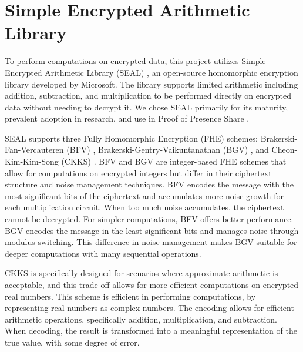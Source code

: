 \section{Simple Encrypted Arithmetic Library}

To perform computations on encrypted data, this project utilizes Simple Encrypted Arithmetic Library (SEAL) \cite{sealcrypto}, an open-source homomorphic encryption library developed by Microsoft. The library supports limited arithmetic including addition, subtraction, and multiplication to be performed directly on encrypted data without needing to decrypt it. We chose SEAL primarily for its maturity, prevalent adoption in research, and use in Proof of Presence Share \cite{Lagesse2021-PopShare}.

SEAL supports three Fully Homomorphic Encryption (FHE) schemes: Brakerski-Fan-Vercauteren (BFV) \cite{fan2012-bfv}, Brakerski-Gentry-Vaikuntanathan (BGV) \cite{brakerski2012-bgv}, and Cheon-Kim-Kim-Song (CKKS) \cite{Cheon2017-CKKS}. BFV and BGV are integer-based FHE schemes that allow for computations on encrypted integers but differ in their ciphertext structure and noise management techniques. BFV encodes the message with the most significant bits of the ciphertext and accumulates more noise growth for each multiplication circuit. When too much noise accumulates, the ciphertext cannot be decrypted. For simpler computations, BFV offers better performance. BGV encodes the message in the least significant bits and manages noise through modulus switching. This difference in noise management makes BGV suitable for deeper computations with many sequential operations. 

CKKS is specifically designed for scenarios where approximate arithmetic is acceptable, and this trade-off allows for more efficient computations on encrypted real numbers. This scheme is efficient in performing computations, by representing real numbers as complex numbers. The encoding allows for efficient arithmetic operations, specifically addition, multiplication, and subtraction. When decoding, the result is transformed into a meaningful representation of the true value, with some degree of error. 
